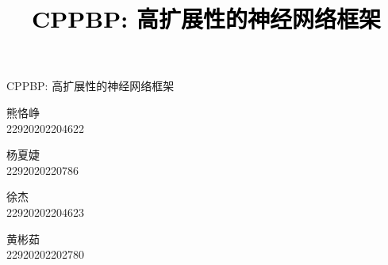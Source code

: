 \documentclass[a4paper,twoside,twocolumn]{article}
\newcommand{\PaperTitle}{CPPBP: 高扩展性的神经网络框架}  %
\begin{document}
\newpage

\title{
	\Large{\textcolor{black}{\PaperTitle}}
}

\maketitle

	
\tableofcontents
 
\newpage
\setcounter{page}{1}

\twocolumn

\begin{strip}
	\centering
	\LARGE \PaperTitle
	\vspace*{0.5cm}
	\normalsize
	\begin{minipage}{\linewidth}
		\centering
		\begin{minipage}[t]{1.2in}
			\centering
			熊恪峥 \\
			22920202204622 \\
		\end{minipage}
		\begin{minipage}[t]{1.2in}
			\centering
			杨夏婕 \\
			2292020220786
		\end{minipage}
		\begin{minipage}[t]{1.2in}
			\centering
			徐杰 \\
			22920202204623
		\end{minipage}\begin{minipage}[t]{1.2in}
			\centering
			黄彬茹 \\
			22920202202780
		\end{minipage}
	\end{minipage}
	\vspace*{0.25cm}
\end{strip}
\end{document}
